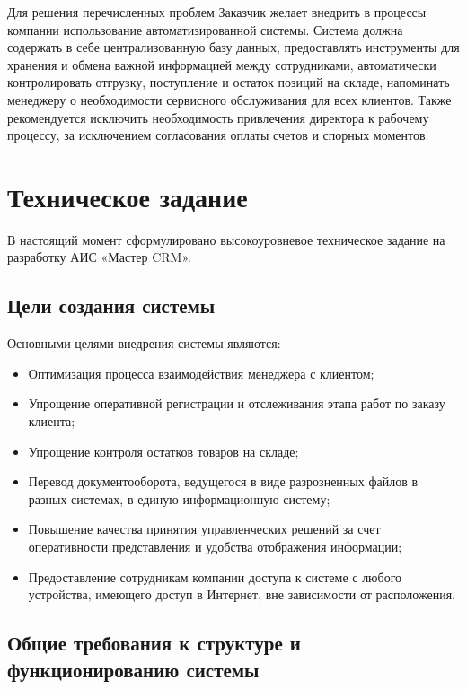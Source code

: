 \documentclass[a4paper,12pt]{article}
\begin{document}
Для решения перечисленных проблем Заказчик желает внедрить в процессы компании использование автоматизированной системы. Система должна содержать в себе централизованную базу данных, предоставлять инструменты для хранения и обмена важной информацией между сотрудниками, автоматически контролировать отгрузку, поступление и остаток позиций на складе, напоминать менеджеру о необходимости сервисного обслуживания для всех клиентов. Также рекомендуется исключить необходимость привлечения директора к рабочему процессу, за исключением согласования оплаты счетов и спорных моментов.





\newpage
\section{Техническое задание}
В настоящий момент сформулировано высокоуровневое техническое задание на разработку АИС «Мастер CRM».

\subsection{Цели создания системы}

Основными целями внедрения системы являются:
\begin{itemize}
    \item Оптимизация процесса взаимодействия менеджера с клиентом;
    \item Упрощение оперативной регистрации и отслеживания этапа работ по заказу клиента;
    \item Упрощение контроля остатков товаров на складе;
    \item Перевод документооборота, ведущегося в виде разрозненных файлов в разных системах, в единую информационную систему;
    \item Повышение качества принятия управленческих решений за счет оперативности представления и удобства отображения информации;
    \item Предоставление сотрудникам компании доступа к системе с любого устройства, имеющего доступ в Интернет, вне зависимости от расположения.
\end{itemize}


\subsection{Общие требования к структуре и функционированию системы}
\end{document}
